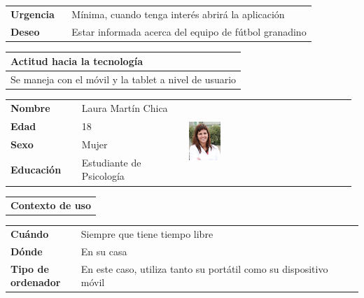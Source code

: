 \documentclass[11pt]{article}
\begin{document}
\begin{table}[H]
  \begin{tabular}{p{0.2\linewidth}|p{0.8\linewidth}}
    \toprule
    \textbf{Urgencia} & Mínima, cuando tenga interés abrirá la aplicación\\
    \textbf{Deseo}  & Estar informada acerca del equipo de fútbol granadino \\
    \bottomrule
  \end{tabular}

  \begin{tabular}{p{1.028\linewidth}}
    \textbf{Actitud hacia la tecnología}\\
    \midrule
    Se maneja con el móvil y la tablet a nivel de usuario
  \end{tabular}
\end{table}

\begin{table}[H]
  \centering
  \begin{tabular}{p{0.2\linewidth}|p{0.3\linewidth}p{0.475\linewidth}}
    \toprule
    \textbf{Nombre} & Laura Martín Chica  &\multirow{4}{*}{\begin{minipage}{1.\textwidth}\includegraphics[width=0.2\textwidth, height=30mm]{Ana}\end{minipage}}\\
    \textbf{Edad} & 18 & \\
    \textbf{Sexo} & Mujer & \\
    \textbf{Educación} & Estudiante de Psicología & \\
    \bottomrule
  \end{tabular}

  \begin{tabular}{l}
    \textbf{Contexto de uso} 
  \end{tabular}
  
  \begin{tabular}{p{0.2\linewidth}|p{0.8\linewidth}}
    \toprule
    \textbf{Cuándo} & Siempre que tiene tiempo libre\\
    \textbf{Dónde}  & En su casa\\
    \textbf{Tipo de ordenador} & En este caso, utiliza tanto su portátil como su dispositivo móvil\\
    \bottomrule
  \end{tabular}


\end{table}
\end{document}
